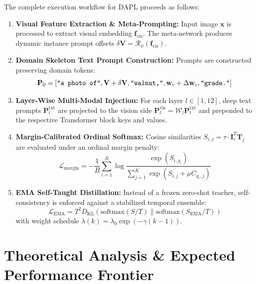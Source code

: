 \documentclass[letterpaper,11pt,leqno]{article}
\begin{document}
The complete execution workflow for DAPL proceeds as follows:
\begin{enumerate}
    \item \textbf{Visual Feature Extraction \& Meta-Prompting:} Input image $\mathbf{x}$ is processed to extract visual embedding $\mathbf{f}_\mathrm{vis}$. The meta-network produces dynamic instance prompt offsets $\delta \mathbf{V} = \mathcal{R}_\phi(\mathbf{f}_\mathrm{vis})$.
    \item \textbf{Domain Skeleton Text Prompt Construction:} Prompts are constructed preserving domain tokens:
    \begin{equation}
        \mathbf{P}_0 = \left[ \text{\texttt{"a photo of"}}, \mathbf{V} + \delta \mathbf{V}, \text{\texttt{"walnut,"}}, \mathbf{w}_c + \Delta \mathbf{w}_c, \text{\texttt{"grade."}} \right]
    \end{equation}
    \item \textbf{Layer-Wise Multi-Modal Injection:} For each layer $l \in [1, 12]$, deep text prompts $\mathbf{P}_l^\mathrm{txt}$ are projected to the vision side $\mathbf{P}_l^\mathrm{vis} = \mathcal{W}_l \mathbf{P}_l^\mathrm{txt}$ and prepended to the respective Transformer block keys and values.
    \item \textbf{Margin-Calibrated Ordinal Softmax:} Cosine similarities $S_{i, j} = \tau \cdot \mathbf{I}_i^T \mathbf{T}_j$ are evaluated under an ordinal margin penalty:
    \begin{equation}
        \mathcal{L}_\mathrm{margin} = -\frac{1}{B} \sum_{i=1}^B \log \frac{\exp(S_{i, y_i})}{\sum_{j=1}^K \exp(S_{i, j} + \mu C_{y_i, j})}
    \end{equation}
    \item \textbf{EMA Self-Taught Distillation:} Instead of a frozen zero-shot teacher, self-consistency is enforced against a stabilized temporal ensemble:
    \begin{equation}
        \mathcal{L}_\mathrm{EMA} = T^2 D_\mathrm{KL}\left(\mathrm{softmax}(S / T) \parallel \mathrm{softmax}(S_\mathrm{EMA} / T)\right)
    \end{equation}
    with weight schedule $\lambda(k) = \lambda_0 \exp(-\gamma (k-1))$.
\end{enumerate}

\newpage
\section{Theoretical Analysis \& Expected Performance Frontier}
\end{document}

